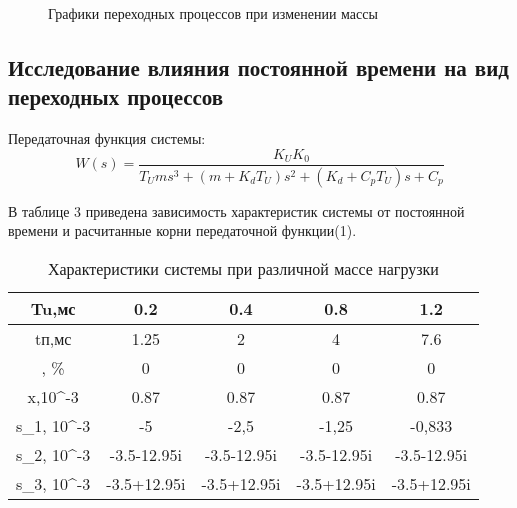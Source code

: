 \documentclass[a4paper, 12pt]{article}
\begin{document}
\begin{figure}[h!]
\begin{minipage}[h]{0.49\linewidth}
\end{minipage}
\hfill
\begin{minipage}[h]{0.49\linewidth}
\end{minipage}
\vfill
\begin{minipage}[h]{0.49\linewidth}
\end{minipage}
\hfill
\begin{minipage}[h]{0.49\linewidth}
\end{minipage}
\begin{minipage}[h]{0.49\linewidth}
\end{minipage}
\caption{Графики переходных процессов при изменении массы}
\end{figure}
\newpage
\begin{center}
	\section{Исследование влияния постоянной времени на вид переходных процессов}
\end{center}
Передаточная функция системы:\\
\begin{equation}
W(s)=\frac{K_UK_0}{T_Ums^3+(m+K_dT_U)s^2+(K_d+C_pT_U)s+C_p}
\end{equation}\par
В таблице 3 приведена зависимость характеристик системы от постоянной времени и расчитанные корни передаточной функции(1).   
\begin{table}[h!]
	\caption{Характеристики системы при различной массе нагрузки }
	\renewcommand{\arraystretch}{1}
	\renewcommand{\tabcolsep}{0.75cm}
	\begin{tabular}{|c|c|c|c|c|}
		\hline
		Tu,мс	&	0.2	&	0.4	&	0.8	&	1.2	\\
		\hline
		tп,мс	&	1.25	&	2	&	4	&	7.6	\\
		\hline
		\sigma, \%	&	0	&	0	&	0	&	0	\\
		\hline
		x,10^{-3} \text{ м}	&	0.87	&	0.87	&	0.87	&	0.87	\\
		\hline
		s_1, 10^{-3}	&	-5	&	-2,5	&	-1,25	&	-0,833	\\
		\hline
		s_2, 10^{-3}	&	-3.5-12.95i	&	-3.5-12.95i	&	-3.5-12.95i	&	-3.5-12.95i	\\
		\hline
		s_3, 10^{-3}	&	-3.5+12.95i	&	-3.5+12.95i	&	-3.5+12.95i	&	-3.5+12.95i	\\
		\hline
	\end{tabular}
\end{table}\par
\end{document}
